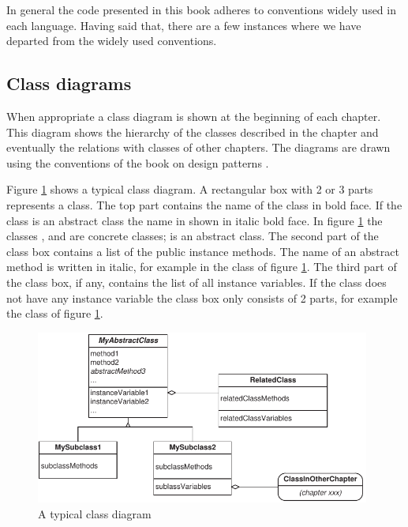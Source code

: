 In general the code presented in this book adheres to conventions
widely used in each language. Having said that, there are a few
instances where we have departed from the widely used conventions.

\subsection{Class diagrams}
When appropriate a class diagram is shown at the beginning of each
chapter. This diagram shows the hierarchy of the classes described
in the chapter and eventually the relations with classes of other
chapters. The diagrams are drawn using the conventions of the book
on design patterns \cite{GoF}.

Figure \ref{fig:classDiagram} shows a typical class diagram. A
rectangular box with 2 or 3 parts represents a class. The top part
contains the name of the class in bold face. If the class is an
abstract class the name in shown in italic bold face.
In figure \ref{fig:classDiagram} the classes ,  and  are concrete classes;  is an abstract class.
The second part of the class box contains a list of the public instance methods.
The name of an abstract method is written in italic, for example  in the class  of figure \ref{fig:classDiagram}.
The third part of the class box, if any, contains the list of all instance variables.
If the class does not
have any instance variable the class box only consists of 2 parts,
for example the class  of figure
\ref{fig:classDiagram}.
\begin{figure}
\centering\includegraphics[width=11cm]{Figures/TypicalClassDiagram}
\caption{A typical class diagram} \label{fig:classDiagram}
\end{figure}

